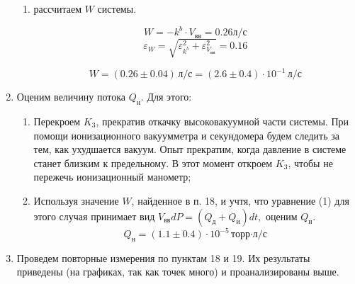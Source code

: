 \documentclass[a4paper,12pt]{article} %
\begin{document}
\begin{enumerate}
\begin{enumerate}
        \item рассчитаем \( W \) системы.
        
        \begin{equation}
          W = -k^b \cdot V_{\text{вв}} = 0.26 \text{л}/\text{с}
        \end{equation}
        \begin{equation}
          \varepsilon_W = \sqrt{\varepsilon_{k^b}^2 + \varepsilon_{V_{\text{вв}}}^2} = 0.16
        \end{equation}
        
        \begin{equation}
          W = (0.26 \pm 0.04) \, \text{л/с} = (2.6 \pm 0.4) \cdot 10^{-1} \, \text{л/с} 
        \end{equation}
    \end{enumerate}
    
    \item Оценим величину потока \( Q_{\text{н}} \). Для этого:
    \begin{enumerate}
        \item Перекроем $K_3$, прекратив откачку высоковакуумной части системы. При помощи ионизационного вакуумметра и секундомера будем следить за тем, как ухудшается вакуум. Опыт прекратим, когда давление в системе станет близким к предельному. В этот момент откроем $K_3$, чтобы не пережечь ионизационный манометр;
        \item Используя значение \( W \), найденное в п. 18, и учтя, что уравнение (1) для этого случая принимает вид \(V_{\text{вв}} dP = (Q_{\text{д}} + Q_{\text{и}}) dt,\) оценим \( Q_{\text{н}} \).
        \begin{equation}
          Q_{\text{н}} = (1.1 \pm 0.4) \cdot 10^{-5} \, \text{торр·л}/\text{с}
        \end{equation}

    \end{enumerate}

    \item Проведем повторные измерения по пунктам 18 и 19. Их результаты приведены (на графиках, так как точек много) и проанализированы выше.

\end{enumerate}
\end{document}
